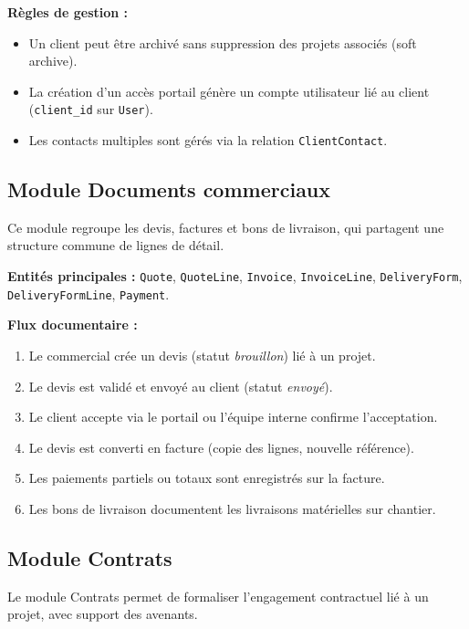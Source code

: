 \medskip

\textbf{Règles de gestion :}
\begin{itemize}
  \item Un client peut être archivé sans suppression des projets associés (soft archive).
  \item La création d'un accès portail génère un compte utilisateur lié au client
  (\texttt{client\_id} sur \texttt{User}).
  \item Les contacts multiples sont gérés via la relation \texttt{ClientContact}.
\end{itemize}

\subsection{Module Documents commerciaux}

Ce module regroupe les devis, factures et bons de livraison, qui partagent une
structure commune de lignes de détail.

\medskip

\textbf{Entités principales :} \texttt{Quote}, \texttt{QuoteLine}, \texttt{Invoice},
\texttt{InvoiceLine}, \texttt{DeliveryForm}, \texttt{DeliveryFormLine}, \texttt{Payment}.

\medskip

\textbf{Flux documentaire :}
\begin{enumerate}
  \item Le commercial crée un devis (statut \textit{brouillon}) lié à un projet.
  \item Le devis est validé et envoyé au client (statut \textit{envoyé}).
  \item Le client accepte via le portail ou l'équipe interne confirme l'acceptation.
  \item Le devis est converti en facture (copie des lignes, nouvelle référence).
  \item Les paiements partiels ou totaux sont enregistrés sur la facture.
  \item Les bons de livraison documentent les livraisons matérielles sur chantier.
\end{enumerate}

\subsection{Module Contrats}

Le module Contrats permet de formaliser l'engagement contractuel lié à un projet,
avec support des avenants.

